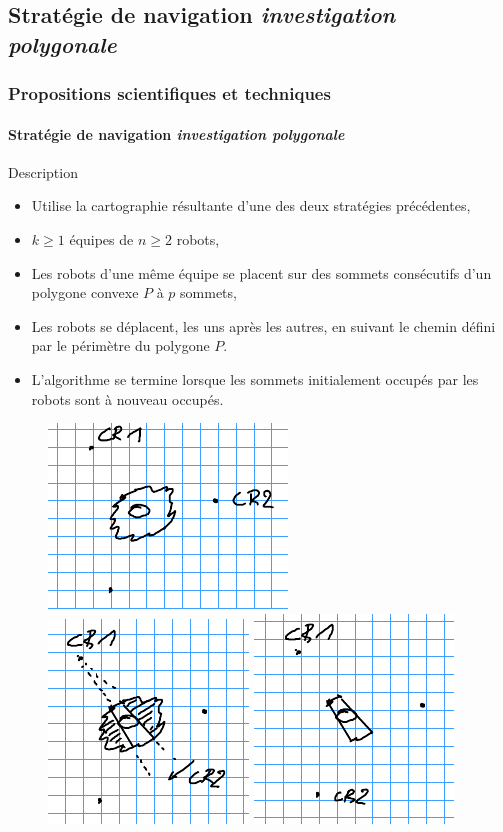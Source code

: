 \documentclass{beamer}
\newcommand{\compresslist}{\setlength{\itemsep}{0pt}\setlength{\parskip}{1pt}\setlength{\parsep}{0pt}}
\begin{document}
		\subsection{Stratégie de navigation \textit{investigation polygonale}}
			\begin{frame}
				\frametitle{Propositions scientifiques et techniques}
				\framesubtitle{Stratégie de navigation \textit{investigation polygonale}}
				\vspace{-5pt}
				\tiny
				\begin{block}{Description}\compresslist
					\begin{itemize}
						\item Utilise la cartographie résultante d'une des deux stratégies précédentes,
						\item $k \ge 1$ équipes de $n \ge 2$ robots,
						\item Les robots d'une même équipe se placent sur des sommets consécutifs d'un polygone convexe $P$ à $p$ sommets,
						\item Les robots se déplacent, les uns après les autres, en suivant le chemin défini par le périmètre du polygone $P$.
						\item L'algorithme se termine lorsque les sommets initialement occupés par les robots sont à nouveau occupés.
					\end{itemize}
				\end{block}
				\vspace{-5pt}
				\begin{figure}
					\centering
					\includegraphics[height=0.2\linewidth]{graphics/triangle_1.png}
					\includegraphics[height=0.2\linewidth]{graphics/triangle_2.png}
					\includegraphics[height=0.2\linewidth]{graphics/triangle_3.png}

\end{figure}
\end{frame}
\end{document}
